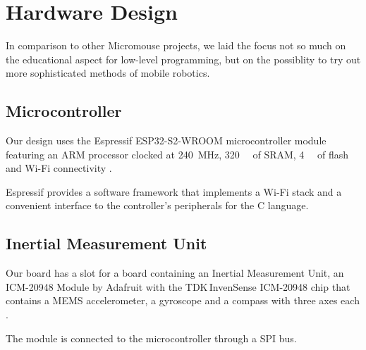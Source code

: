 \section{Hardware Design}
In comparison to other Micromouse projects, we laid the focus not so much on
the educational aspect for low-level programming, but on the possiblity to try
out more sophisticated methods of mobile robotics.

\subsection{Microcontroller}
Our design uses the Espressif ESP32-S2-WROOM microcontroller module
featuring an ARM processor clocked at \SI{240}{\mega\hertz},
\SI{320}{\kilo\byte} of SRAM, \SI{4}{\mega\byte} of flash and Wi-Fi
connectivity \cite{esp32-s2-wroom-datasheet}.

Espressif provides a software framework that implements a Wi-Fi stack and a
convenient interface to the controller's peripherals for the C language.

\subsection{Inertial Measurement Unit}
Our board has a slot for a board containing an Inertial Measurement Unit, an
ICM-20948 Module by Adafruit with the TDK\,InvenSense ICM-20948 chip that
contains a MEMS accelerometer, a gyroscope and a compass with three axes each
\cite{icm20948-datasheet}.

The module is connected to the microcontroller through a SPI bus.
